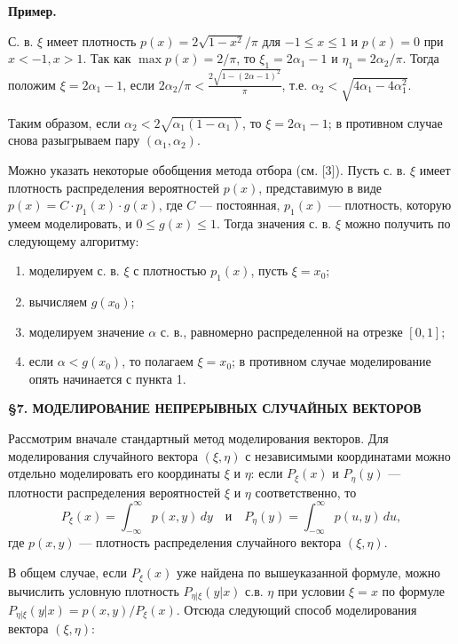 \documentclass[bachelor, och, pract3]{SCWorks}
\begin{document}
\textbf{Пример.}

С. в. \(\xi\) имеет плотность \(p(x) = 2\sqrt{1-x^2} / \pi\) для \(-1 \le x \le 1\) и \(p(x) = 0\) при \(x < -1, x > 1\). Так как \(\max p(x) = 2/\pi\), то $\xi_1 = 2 \alpha_1 - 1$ и $\eta_1 = 2 \alpha_2/ \pi$. Тогда положим $\xi = 2 \alpha_1 - 1$, если $2 \alpha_2/ \pi < \frac{2 \sqrt{1 - (2 \alpha - 1)^2}}{\pi}$, т.е. $\alpha_2 < \sqrt{4 \alpha_1 - 4 \alpha_1^2}$.

Таким образом, если $\alpha_2 < 2 \sqrt{\alpha_1(1 - \alpha_1)}$, то $\xi = 2 \alpha_1 - 1$; в противном случае снова разыгрываем пару $(\alpha_1, \alpha_2)$.

Можно указать некоторые обобщения метода отбора (см. [3]). Пусть с. в. \(\xi\) имеет плотность распределения вероятностей \(p(x)\), представимую в виде \(p(x) = C \cdot p_1(x) \cdot g(x)\), где \(C\) --- постоянная, \(p_1(x)\) --- плотность, которую умеем моделировать, и \(0 \le g(x) \le 1\). Тогда значения с. в. \(\xi\) можно получить по следующему алгоритму:
\begin{enumerate}
    \item моделируем с. в. \(\xi\) с плотностью \(p_1(x)\), пусть \(\xi = x_0\);
    \item вычисляем \(g(x_0)\);
    \item моделируем значение \(\alpha\) с. в., равномерно распределенной на отрезке \([0, 1]\);
    \item если \(\alpha < g(x_0)\), то полагаем \(\xi = x_0\); в противном случае моделирование опять начинается с пункта 1.
\end{enumerate}


\noindent \textbf{\S 7. МОДЕЛИРОВАНИЕ НЕПРЕРЫВНЫХ СЛУЧАЙНЫХ ВЕКТОРОВ}

Рассмотрим вначале стандартный метод моделирования векторов. Для моделирования случайного вектора \((\xi, \eta)\) с независимыми координатами можно отдельно моделировать его координаты \(\xi\) и \(\eta\): если \(P_\xi(x)\) и \(P_\eta(y)\) --- плотности распределения вероятностей \(\xi\) и \(\eta\) соответственно, то 
\[ P_\xi(x) = \int_{-\infty}^{\infty} p(x,y)\,dy \quad \text{и} \quad P_\eta(y) = \int_{-\infty}^{\infty} p(u,y)\,du, \]
где \(p(x,y)\) --- плотность распределения случайного вектора \((\xi, \eta)\).

В общем случае, если \(P_\xi(x)\) уже найдена по вышеуказанной формуле, можно вычислить условную плотность \(P_{\eta|\xi}(y|x)\) с.в. $\eta$ при условии $\xi = x$ по формуле \(P_{\eta|\xi}(y|x) = p(x,y) / P_\xi(x)\). Отсюда следующий способ моделирования вектора \((\xi, \eta)\):
\end{document}
